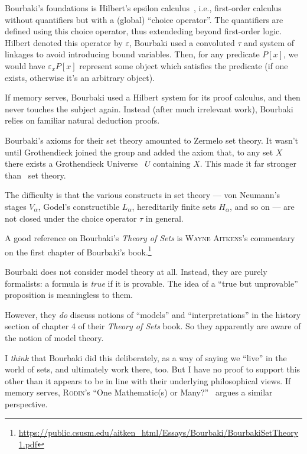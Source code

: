\begin{node}\label{bourbaki-0003}%
Bourbaki's foundations is Hilbert's epsilon
calculus~, i.e., first-order calculus without
quantifiers but with a (global) ``choice operator''. The quantifiers are
defined using this choice operator, thus extendeding beyond first-order
logic. Hilbert denoted this operator by $\varepsilon$, Bourbaki used a
convoluted $\tau$ and system of linkages to avoid introducing bound
variables. Then, for any predicate $P[x]$, we would have
$\varepsilon_{x}P[x]$ represent some object which satisfies the
predicate (if one exists, otherwise it's an arbitrary object).

If memory serves, Bourbaki used a Hilbert system for its proof calculus,
and then never touches the subject again. Instead (after much irrelevant
work), Bourbaki relies on familiar natural deduction proofs.

Bourbaki's axioms for their set theory amounted to Zermelo set
theory. It wasn't until Grothendieck joined the group and added the
axiom that, to any set $X$ there exists a Grothendieck Universe~ $U$
containing $X$. This made it far stronger than \ZFC\ set theory.

The difficulty is that the various constructs in set theory --- von
Neumann's stages $V_{\alpha}$, Godel's constructible $L_{\alpha}$,
hereditarily finite sets $H_{\alpha}$, and so on --- are not closed
under the choice operator $\tau$ in general.

A good reference on Bourbaki's \textit{Theory of Sets} is \textsc{Wayne Aitkens}'s commentary on the first chapter of Bourbaki's book.\footnote{\url{https://public.csusm.edu/aitken_html/Essays/Bourbaki/BourbakiSetTheory1.pdf}}
\end{node}

\begin{node}\label{bourbaki-0004}%
Bourbaki does not consider model theory at all. Instead, they are purely
formalists: a formula is \emph{true} if it is provable. The idea of a
``true but unprovable'' proposition is meaningless to them.

However, they \textit{do} discuss notions of ``models'' and
``interpretations'' in the history section of chapter 4 of their
\textit{Theory of Sets} book. So they apparently are aware of the notion
of model theory.

I \emph{think} that Bourbaki did this deliberately, as a way of saying
we ``live'' in the world of sets, and ultimately work there, too. But I
have no proof to support this other than it appears to be in line with
their underlying philosophical views. If memory serves, \textsc{Rodin}'s
``One Mathematic(s) or Many?''~\cite{Rodin_2021} argues a similar perspective.
\end{node}

